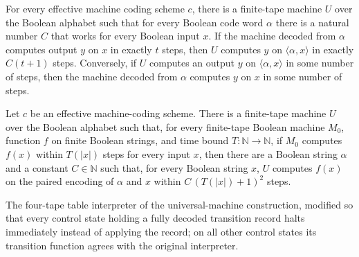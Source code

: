 \begin{theorem}
\label{Turing.universal}
\leanok
{}
For every effective machine coding scheme $c$, there is a finite-tape machine $U$ over
the Boolean alphabet such that for every Boolean code word $\alpha$ there is a natural
number $C$ that works for every Boolean input $x$. If the machine decoded from $\alpha$
computes output $y$ on $x$ in exactly $t$ steps, then $U$ computes $y$ on
$\langle\alpha,x\rangle$ in exactly $C(t+1)$ steps. Conversely, if $U$ computes an
output $y$ on $\langle\alpha,x\rangle$ in some number of steps, then the machine decoded
from $\alpha$ computes $y$ on $x$ in some number of steps.
\end{theorem}

\begin{theorem}
\label{Turing.universal_quadratic}
\leanok
{}
Let $c$ be an effective machine-coding scheme. There is a finite-tape machine $U$ over
the Boolean alphabet such that, for every finite-tape Boolean machine $M_0$, function
$f$ on finite Boolean strings, and time bound $T\colon\mathbb{N}\to\mathbb{N}$, if $M_0$
computes $f(x)$ within $T(|x|)$ steps for every input $x$, then there are a Boolean
string $\alpha$ and a constant $C\in\mathbb{N}$ such that, for every Boolean string $x$,
$U$ computes $f(x)$ on the paired encoding of $\alpha$ and $x$ within $C\,(T(|x|)+1)^2$
steps.
\end{theorem}

\begin{definition}
\label{Turing.timedCutInterpreter}
\leanok
{}
The four-tape table interpreter of the universal-machine construction,
modified so that every control state holding a fully decoded transition record
halts immediately instead of applying the record; on all other control states
its transition function agrees with the original interpreter.
\end{definition}

